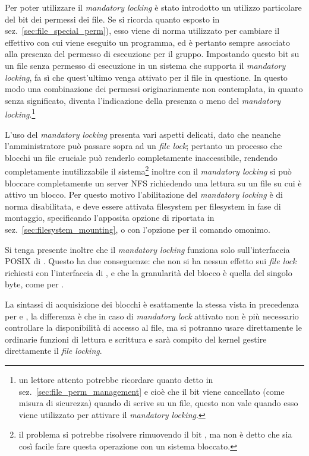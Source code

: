 Per poter utilizzare il \textit{mandatory locking} è stato introdotto un
utilizzo particolare del bit  dei permessi dei file. Se si ricorda
quanto esposto in sez.~\ref{sec:file_special_perm}), esso viene di norma
utilizzato per cambiare il  effettivo con cui viene eseguito un
programma, ed è pertanto sempre associato alla presenza del permesso di
esecuzione per il gruppo. Impostando questo bit su un file senza permesso di
esecuzione in un sistema che supporta il \textit{mandatory locking}, fa sì che
quest'ultimo venga attivato per il file in questione. In questo modo una
combinazione dei permessi originariamente non contemplata, in quanto senza
significato, diventa l'indicazione della presenza o meno del \textit{mandatory
  locking}.\footnote{un lettore attento potrebbe ricordare quanto detto in
  sez.~\ref{sec:file_perm_management} e cioè che il bit  viene
  cancellato (come misura di sicurezza) quando di scrive su un file, questo
  non vale quando esso viene utilizzato per attivare il \textit{mandatory
    locking}.}

L'uso del \textit{mandatory locking} presenta vari aspetti delicati, dato che
neanche l'amministratore può passare sopra ad un \textit{file lock}; pertanto
un processo che blocchi un file cruciale può renderlo completamente
inaccessibile, rendendo completamente inutilizzabile il sistema\footnote{il
  problema si potrebbe risolvere rimuovendo il bit , ma non è detto
  che sia così facile fare questa operazione con un sistema bloccato.}
inoltre con il \textit{mandatory locking} si può bloccare completamente un
server NFS richiedendo una lettura su un file su cui è attivo un blocco. Per
questo motivo l'abilitazione del \textit{mandatory locking} è di norma
disabilitata, e deve essere attivata filesystem per filesystem in fase di
montaggio, specificando l'apposita opzione di  riportata in
sez.~\ref{sec:filesystem_mounting}, o con l'opzione  per il
comando omonimo.

Si tenga presente inoltre che il \textit{mandatory locking} funziona solo
sull'interfaccia POSIX di . Questo ha due conseguenze: che non si
ha nessun effetto sui \textit{file lock} richiesti con l'interfaccia di
, e che la granularità del blocco è quella del singolo byte, come
per .

La sintassi di acquisizione dei blocchi è esattamente la stessa vista in
precedenza per  e , la differenza è che in caso di
\textit{mandatory lock} attivato non è più necessario controllare la
disponibilità di accesso al file, ma si potranno usare direttamente le
ordinarie funzioni di lettura e scrittura e sarà compito del kernel gestire
direttamente il \textit{file locking}.

